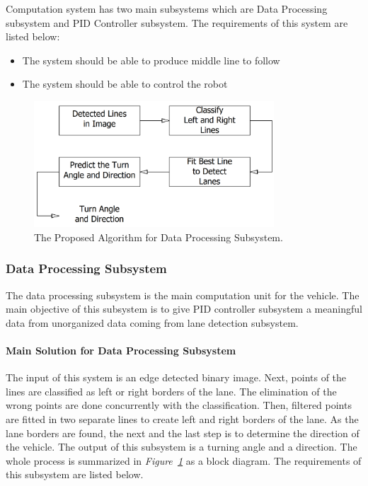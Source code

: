 \documentclass[a4paper,12pt]{article}
\begin{document}
	Computation system has two main subsystems which are Data Processing subsystem and PID Controller subsystem. The requirements of this system are listed below:
	\begin{itemize}
		\item The system should	be able to produce middle line to follow
		\item The system should be able to control the robot
	\end{itemize}	
	
		\begin{figure}[t]
		\center
		\setlength{\unitlength}{\textwidth} 
		\includegraphics[width=0.8\textwidth]{v-models/data_processing_subsystem}
		\caption{\label{fig:data_processing_subsystem}The Proposed Algorithm for Data Processing Subsystem.}
	\end{figure}
	\subsubsection{Data Processing Subsystem}
	
		The data processing subsystem is the main computation unit for the vehicle. The main objective of this subsystem is to give PID controller subsystem a meaningful data from unorganized data coming from lane detection subsystem. 
	
	\paragraph{Main Solution for Data Processing Subsystem}
	
	The input of this system is an edge detected binary image.  Next, points of the lines are classified as left or right borders of the lane. The elimination of the wrong points are done concurrently with the classification. Then, filtered points are fitted in two separate lines to create left and right borders of the lane. As the lane borders are found, the next and the last step is to determine the direction of the vehicle. The output of this subsystem is a turning angle and a direction. The whole process is summarized in \textit{Figure~\ref{fig:data_processing_subsystem}} as a block diagram. The requirements of this subsystem are listed below.\\
	
\end{document}
